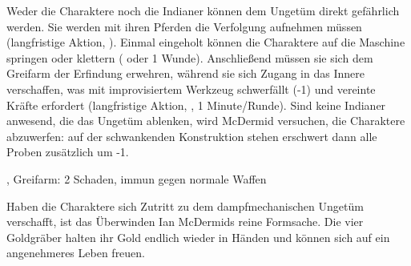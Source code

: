 {		Weder die Charaktere noch die Indianer können dem Ungetüm direkt gefährlich werden. Sie werden mit ihren Pferden die Verfolgung aufnehmen müssen (langfristige Aktion, ). Einmal eingeholt können die Charaktere auf die Maschine springen oder klettern ( oder 1 Wunde). Anschließend müssen sie sich dem Greifarm der Erfindung erwehren, während sie sich Zugang in das Innere verschaffen, was mit improvisiertem Werkzeug schwerfällt (-1) und vereinte Kräfte erfordert (langfristige Aktion, , 1 Minute/Runde). Sind keine Indianer anwesend, die das Ungetüm ablenken, wird McDermid versuchen, die Charaktere abzuwerfen: auf der schwankenden Konstruktion stehen erschwert dann alle Proben zusätzlich um -1.

		, Greifarm: 2 Schaden, immun gegen normale Waffen



		\noindent
		Haben die Charaktere sich Zutritt zu dem dampfmechanischen Ungetüm verschafft, ist das Überwinden Ian McDermids reine Formsache. Die vier Goldgräber halten ihr Gold endlich wieder in Händen und können sich auf ein angenehmeres Leben freuen.
}
